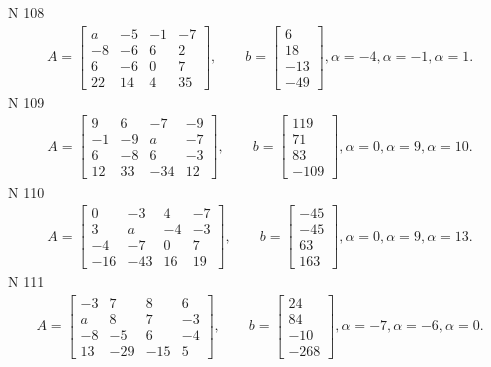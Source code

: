 \documentclass[11pt]{report}
\begin{document}
N 108
\begin{align*}
 A = \left[\begin{matrix}a & -5 & -1 & -7\\-8 & -6 & 6 & 2\\6 & -6 & 0 & 7\\22 & 14 & 4 & 35\end{matrix}\right],
    \qquad b = \left[\begin{matrix}6\\18\\-13\\-49\end{matrix}\right], \alpha = -4, \alpha = -1, \alpha = 1. 
 \end{align*}
N 109
\begin{align*}
 A = \left[\begin{matrix}9 & 6 & -7 & -9\\-1 & -9 & a & -7\\6 & -8 & 6 & -3\\12 & 33 & -34 & 12\end{matrix}\right],
    \qquad b = \left[\begin{matrix}119\\71\\83\\-109\end{matrix}\right], \alpha = 0, \alpha = 9, \alpha = 10. 
 \end{align*}
N 110
\begin{align*}
 A = \left[\begin{matrix}0 & -3 & 4 & -7\\3 & a & -4 & -3\\-4 & -7 & 0 & 7\\-16 & -43 & 16 & 19\end{matrix}\right],
    \qquad b = \left[\begin{matrix}-45\\-45\\63\\163\end{matrix}\right], \alpha = 0, \alpha = 9, \alpha = 13. 
 \end{align*}
N 111
\begin{align*}
 A = \left[\begin{matrix}-3 & 7 & 8 & 6\\a & 8 & 7 & -3\\-8 & -5 & 6 & -4\\13 & -29 & -15 & 5\end{matrix}\right],
    \qquad b = \left[\begin{matrix}24\\84\\-10\\-268\end{matrix}\right], \alpha = -7, \alpha = -6, \alpha = 0. 
 \end{align*}
\end{document}
